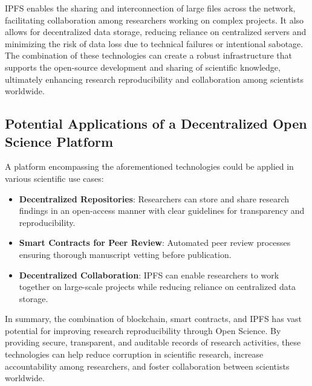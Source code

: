 IPFS enables the sharing and interconnection of large files across the network, facilitating collaboration among researchers working on complex projects. It also allows for decentralized data storage, reducing reliance on centralized servers and minimizing the risk of data loss due to technical failures or intentional sabotage. The combination of these technologies can create a robust infrastructure that supports the open-source development and sharing of scientific knowledge, ultimately enhancing research reproducibility and collaboration among scientists worldwide.

\subsection{Potential Applications of a Decentralized Open Science Platform}

A platform encompassing the aforementioned technologies could be applied in various scientific use cases:

\begin{itemize}
    \item \textbf{Decentralized Repositories}: Researchers can store and share research findings in an open-access manner with clear guidelines for transparency and reproducibility.
    \item \textbf{Smart Contracts for Peer Review}: Automated peer review processes ensuring thorough manuscript vetting before publication.
    \item \textbf{Decentralized Collaboration}: IPFS can enable researchers to work together on large-scale projects while reducing reliance on centralized data storage.
\end{itemize}

In summary, the combination of blockchain, smart contracts, and IPFS has vast potential for improving research reproducibility through Open Science. By providing secure, transparent, and auditable records of research activities, these technologies can help reduce corruption in scientific research, increase accountability among researchers, and foster collaboration between scientists worldwide.
